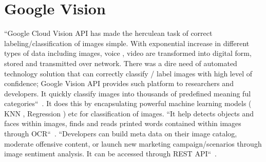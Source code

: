 \section{Google Vision}


``Google Cloud Vision API has made the herculean task of correct 
labeling/classification of images simple. With exponential increase 
in different types of data including images, voice , video are 
transformed into digital form, stored and transmitted over network. 
There was a dire need of automated technology solution that can 
correctly classify / label images with high level of confidence; 
Google Vision API provides such platform to researchers and developers. 
It quickly classify images into thousands of predefined 
meaning ful categories``~\cite{hid-sp18-523-www-google-vision}. 
It does this by encapsulating powerful machine learning 
models ( KNN , Regression ) etc for classification of images. 
``It help detects objects and faces within images, finds and reads 
printed words contained within images through 
OCR``~\cite{hid-sp18-523-www-google-vision}. 
``Developers can build meta data on their image catalog, moderate 
offensive content, or launch new marketing campaign/scenarios through 
image sentiment analysis. It can be accessed 
through REST API``~\cite{hid-sp18-523-www-google-vision}.

